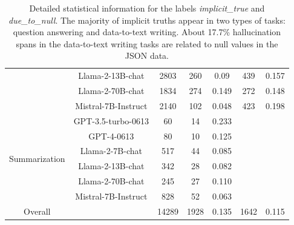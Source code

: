 \begin{table}[h]
\begin{tabular}{c|cccccc}
                                      & Llama-2-13B-chat       & 2803                                   & 260              & 0.09            & 439             & 0.157           \\
                                      & Llama-2-70B-chat       & 1834                                   & 274              & 0.149           & 272             & 0.148           \\
                                      & Mistral-7B-Instruct    & 2140                                   & 102              & 0.048           & 423             & 0.198           \\
\midrule
\multirow{6}{*}{Summarization}        & GPT-3.5-turbo-0613     & 60                                     & 14               & 0.233           &                 &                 \\
                                      & GPT-4-0613             & 80                                     & 10               & 0.125           &                 &                 \\
                                      & Llama-2-7B-chat        & 517                                    & 44               & 0.085           &                 &                 \\
                                      & Llama-2-13B-chat       & 342                                    & 28               & 0.082           &                 &                 \\
                                      & Llama-2-70B-chat       & 245                                    & 27               & 0.110           &                 &                 \\
                                      & Mistral-7B-Instruct    & 828                                    & 52               & 0.063           &                 &                 \\
\midrule
Overall                               &                        & 14289                                  & 1928             & 0.135           & 1642                                                  & 0.115 \\
\bottomrule
\end{tabular}
\caption{Detailed statistical information for the labels \textit{implicit\_true} and \textit{due\_to\_null}. 
The majority of implicit truths appear in two types of tasks: question answering and data-to-text writing.
About 17.7\% hallucination spans in the data-to-text writing tasks are related to null values in the JSON data.}
\label{tab:implicit_true}
\end{table}